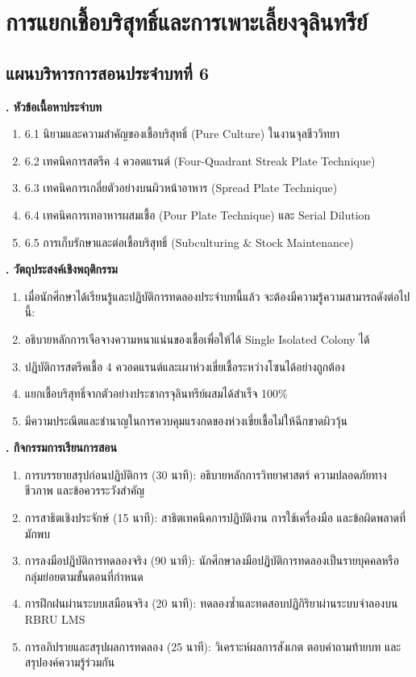\chapter{การแยกเชื้อบริสุทธิ์และการเพาะเลี้ยงจุลินทรีย์}
\label{chap:ch06}

\section*{แผนบริหารการสอนประจำบทที่ 6}

\noindent\textbf{. หัวข้อเนื้อหาประจำบท}

\begin{enumerate}
    \item 6.1 นิยามและความสำคัญของเชื้อบริสุทธิ์ (Pure Culture) ในงานจุลชีววิทยา
    \item 6.2 เทคนิคการสตรีค 4 ควอดแรนต์ (Four-Quadrant Streak Plate Technique)
    \item 6.3 เทคนิคการเกลี่ยตัวอย่างบนผิวหน้าอาหาร (Spread Plate Technique)
    \item 6.4 เทคนิคการเทอาหารผสมเชื้อ (Pour Plate Technique) และ Serial Dilution
    \item 6.5 การเก็บรักษาและต่อเชื้อบริสุทธิ์ (Subculturing \& Stock Maintenance)
\end{enumerate}

\noindent\textbf{. วัตถุประสงค์เชิงพฤติกรรม}

\begin{enumerate}
    \item เมื่อนักศึกษาได้เรียนรู้และปฏิบัติการทดลองประจำบทนี้แล้ว จะต้องมีความรู้ความสามารถดังต่อไปนี้:
    \item อธิบายหลักการเจือจางความหนาแน่นของเชื้อเพื่อให้ได้ Single Isolated Colony ได้
    \item ปฏิบัติการสตรีคเชื้อ 4 ควอดแรนต์และเผาห่วงเขี่ยเชื้อระหว่างโซนได้อย่างถูกต้อง
    \item แยกเชื้อบริสุทธิ์จากตัวอย่างประชากรจุลินทรีย์ผสมได้สำเร็จ 100\%
    \item มีความประณีตและชำนาญในการควบคุมแรงกดของห่วงเขี่ยเชื้อไม่ให้ฉีกขาดผิววุ้น
\end{enumerate}

\noindent\textbf{. กิจกรรมการเรียนการสอน}

\begin{enumerate}
    \item การบรรยายสรุปก่อนปฏิบัติการ (30 นาที): อธิบายหลักการวิทยาศาสตร์ ความปลอดภัยทางชีวภาพ และข้อควรระวังสำคัญ
    \item การสาธิตเชิงประจักษ์ (15 นาที): สาธิตเทคนิคการปฏิบัติงาน การใช้เครื่องมือ และข้อผิดพลาดที่มักพบ
    \item การลงมือปฏิบัติการทดลองจริง (90 นาที): นักศึกษาลงมือปฏิบัติการทดลองเป็นรายบุคคลหรือกลุ่มย่อยตามขั้นตอนที่กำหนด
    \item การฝึกฝนผ่านระบบเสมือนจริง (20 นาที): ทดลองซ้ำและทดสอบปฏิกิริยาผ่านระบบจำลองบน RBRU LMS
    \item การอภิปรายและสรุปผลการทดลอง (25 นาที): วิเคราะห์ผลการสังเกต ตอบคำถามท้ายบท และสรุปองค์ความรู้ร่วมกัน
\end{enumerate}

